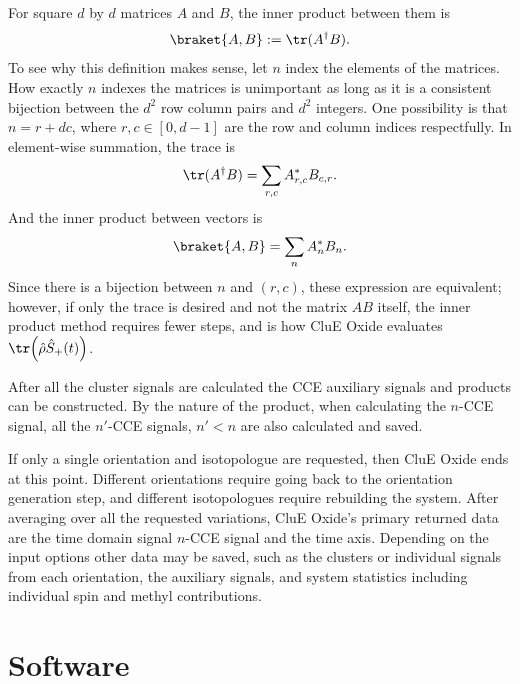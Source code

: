 \documentclass{book}
\begin{document}
For square $d$ by $d$ matrices $A$ and $B$, the inner product between them is
%
\begin{equation}
\braket{A,B} := \tr(A^\dagger B).
\end{equation}
%
To see why this definition makes sense, let $n$ index the elements of the
matrices.  How exactly $n$ indexes the matrices is unimportant as long as it is 
a consistent bijection between the $d^2$ row column pairs and $d^2$ integers.
One possibility is that $n = r + dc$, where $r,c\in [0,d-1]$ 
are the row and column indices respectfully.  In element-wise summation, the
trace is
%
\begin{equation}
\tr(A^\dagger B) = \sum_{r,c} A_{r,c}^{*}B_{c,r}
.
\end{equation}
%
And the inner product between vectors is 
%
\begin{equation}
\braket{A,B} = \sum_{n} A_{n}^{*}B_{n}
.
\end{equation}
%
Since there is a bijection between $n$ and $(r,c)$, 
these expression are equivalent; however, if only the trace is desired and not
the matrix $AB$ itself, the inner product method requires fewer steps, 
and is how CluE Oxide evaluates $\tr\Big(\hat{\rho} \hat{S}_{+}(t)\Big)$.

After all the cluster signals are calculated the CCE auxiliary signals and 
products can be constructed.  By the nature of the product, when calculating 
the $n$-CCE signal, all the $n'$-CCE signals, $n'<n$ are also calculated and 
saved.

If only a single orientation and isotopologue are requested, 
then CluE Oxide ends at this point.  
Different orientations require going back to the orientation
generation step, and different isotopologues require rebuilding the system.
After averaging over all the requested variations, 
CluE Oxide's primary returned data are
the time domain signal $n$-CCE signal and the time axis.  Depending on the 
input options other data may be saved, such as the clusters or 
individual signals from each orientation, the auxiliary signals, 
and system statistics including individual spin and methyl contributions.  
\section{Software}

\end{document}
